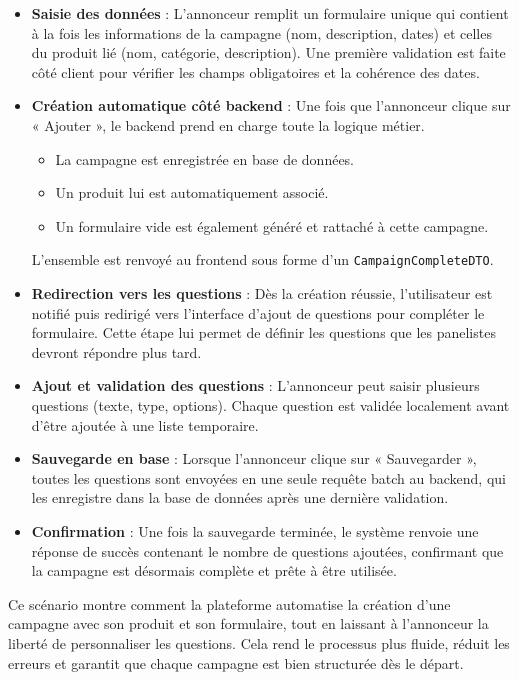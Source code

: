 \begin{itemize}[label=\textbullet]
    \item \textbf{Saisie des données} : L’annonceur remplit un formulaire unique qui contient à la fois les informations de la campagne (nom, description, dates) et celles du produit lié (nom, catégorie, description). Une première validation est faite côté client pour vérifier les champs obligatoires et la cohérence des dates.

    \item \textbf{Création automatique côté backend} :
    Une fois que l’annonceur clique sur « Ajouter », le backend prend en charge toute la logique métier.
    \begin{itemize}
        \item La campagne est enregistrée en base de données.
        \item Un produit lui est automatiquement associé.
        \item Un formulaire vide est également généré et rattaché à cette campagne.
    \end{itemize}
    L’ensemble est renvoyé au frontend sous forme d’un \texttt{CampaignCompleteDTO}.

    \item \textbf{Redirection vers les questions} : Dès la création réussie, l’utilisateur est notifié puis redirigé vers l’interface d’ajout de questions pour compléter le formulaire. Cette étape lui permet de définir les questions que les panelistes devront répondre plus tard.

    \item \textbf{Ajout et validation des questions} : L’annonceur peut saisir plusieurs questions (texte, type, options). Chaque question est validée localement avant d’être ajoutée à une liste temporaire.

    \item \textbf{Sauvegarde en base} : Lorsque l’annonceur clique sur « Sauvegarder », toutes les questions sont envoyées en une seule requête batch au backend, qui les enregistre dans la base de données après une dernière validation.

    \item \textbf{Confirmation} : Une fois la sauvegarde terminée, le système renvoie une réponse de succès contenant le nombre de questions ajoutées, confirmant que la campagne est désormais complète et prête à être utilisée.
\end{itemize}
Ce scénario montre comment la plateforme automatise la création d’une campagne avec son produit et son formulaire, tout en laissant à l’annonceur la liberté de personnaliser les questions. Cela rend le processus plus fluide, réduit les erreurs et garantit que chaque campagne est bien structurée dès le départ.

